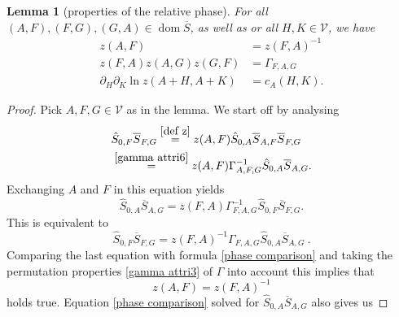\documentclass[b5paper,draft,openbib,12pt]{memoir}
\newtheorem{Lemma}[Def]{Lemma}
\DeclareMathOperator{\dom}{dom}
\begin{document}
\begin{Lemma}[properties of the relative phase]
For all \\
\((A,F),(F,G),(G,A)\in\dom\overline{S}\), as well as 
or all \(H,K\in \mathcal{V}\), we have
\begin{align}\label{z antisym}
z(A,F)&=z(F,A)^{-1}\\\label{z gamma}
z(F,A)z(A,G)z(G,F)&=\Gamma_{F,A,G}\\\label{z c}
\partial_{H}\partial_{K}\ln  z(A+ H,A+ K)&=c_A(H,K).
\end{align}
\end{Lemma}
\begin{proof}
Pick \(A,F,G\in\mathcal{V}\) as in the lemma. We start off by analysing
\begin{align}
&\hat{S}_{0,F}\overline{S}_{F,G}\overset{\eqref{def z}}{=}z(A,F)\hat{S}_{0,A}\overline{S}_{A,F}\overline{S}_{F,G}\\\label{phase comparison}
&\overset{\eqref{gamma attri6}}{=}z(A,F) \Gamma_{A,F,G}^{-1} \hat{S}_{0,A} \overline{S}_{A,G}.
\end{align}
Exchanging  \(A\) and \(F\) in this equation yields
\begin{equation}
\hat{S}_{0,A}\overline{S}_{A,G}=z(F,A) \Gamma_{F,A,G}^{-1} \hat{S}_{0,F} \overline{S}_{F,G}.
\end{equation}
This is equivalent to
\begin{equation}
\hat{S}_{0,F} \overline{S}_{F,G}=z(F,A)^{-1} \Gamma_{F,A,G} \hat{S}_{0,A}\overline{S}_{A,G}~.
\end{equation}
Comparing the last equation with 
formula \eqref{phase comparison} 
and taking the permutation properties 
 \eqref{gamma attri3} of \(\Gamma\) into 
 account this implies that 
\begin{equation}
z(A,F)=z(F,A)^{-1}
\end{equation}
holds true. Equation \eqref{phase comparison} solved for \(\hat{S}_{0,A}\overline{S}_{A,G}\) also gives us


\end{proof}
\end{document}
